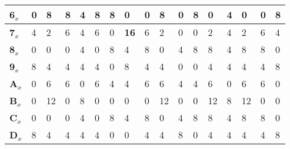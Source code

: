 \begin{longtable}[c]{|l|l|l|l|l|l|l|l|l|l|l|l|l|l|l|l|l|}
\textbf{6$_x$}  & 0              & 8              & 8              & 4              & 8              & 8              & 0              & 0              & 8              & 0              & 8              & 0              & 4              & 0              & 0              & 8              \\ \hline
\textbf{7$_x$}  & 4              & 2              & 6              & 4              & 6              & 0              & \textbf{16}             & 6              & 2              & 0              & 0              & 2              & 4              & 2              & 6              & 4              \\ \hline
\textbf{8$_x$}  & 0              & 0              & 0              & 4              & 0              & 8              & 4              & 8              & 0              & 4              & 8              & 8              & 4              & 8              & 8              & 0              \\ \hline
\textbf{9$_x$}  & 8              & 4              & 4              & 4              & 4              & 0              & 8              & 4              & 4              & 0              & 0              & 4              & 4              & 4              & 4              & 8              \\ \hline
\textbf{A$_x$}  & 0              & 6              & 6              & 0              & 6              & 4              & 4              & 6              & 6              & 4              & 4              & 6              & 0              & 6              & 6              & 0              \\ \hline
\textbf{B$_x$}  & 0              & 12             & 0              & 8              & 0              & 0              & 0              & 0              & 12             & 0              & 0              & 12             & 8              & 12             & 0              & 0              \\ \hline
\textbf{C$_x$}  & 0              & 0              & 0              & 4              & 0              & 8              & 4              & 8              & 0              & 4              & 8              & 8              & 4              & 8              & 8              & 0              \\ \hline
\textbf{D$_x$}  & 8              & 4              & 4              & 4              & 4              & 0              & 0              & 4              & 4              & 8              & 0              & 4              & 4              & 4              & 4              & 8              \\ \hline

\end{longtable}

